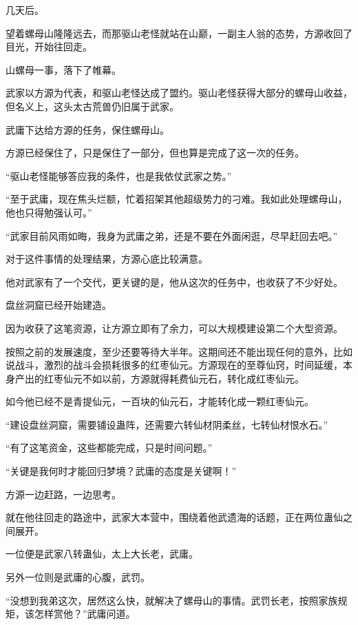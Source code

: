 
\begin{this_body}



几天后。

望着螺母山隆隆远去，而那驱山老怪就站在山巅，一副主人翁的态势，方源收回了目光，开始往回走。

山螺母一事，落下了帷幕。

武家以方源为代表，和驱山老怪达成了盟约。驱山老怪获得大部分的螺母山收益，但名义上，这头太古荒兽仍旧属于武家。

武庸下达给方源的任务，保住螺母山。

方源已经保住了，只是保住了一部分，但也算是完成了这一次的任务。

“驱山老怪能够答应我的条件，也是我依仗武家之势。”

“至于武庸，现在焦头烂额，忙着招架其他超级势力的刁难。我如此处理螺母山，他也只得勉强认可。”

“武家目前风雨如晦，我身为武庸之弟，还是不要在外面闲逛，尽早赶回去吧。”

对于这件事情的处理结果，方源心底比较满意。

他对武家有了一个交代，更关键的是，他从这次的任务中，也收获了不少好处。

盘丝洞窟已经开始建造。

因为收获了这笔资源，让方源立即有了余力，可以大规模建设第二个大型资源。

按照之前的发展速度，至少还要等待大半年。这期间还不能出现任何的意外，比如说战斗，激烈的战斗会损耗很多的红枣仙元。方源现在的至尊仙窍，时间延缓，本身产出的红枣仙元不如以前，方源就得耗费仙元石，转化成红枣仙元。

如今他已经不是青提仙元，一百块的仙元石，才能转化成一颗红枣仙元。

“建设盘丝洞窟，需要铺设蛊阵，还需要六转仙材阴柔丝，七转仙材恨水石。”

“有了这笔资金，这些都能完成，只是时间问题。”

“关键是我何时才能回归梦境？武庸的态度是关键啊！”

方源一边赶路，一边思考。

就在他往回走的路途中，武家大本营中，围绕着他武遗海的话题，正在两位蛊仙之间展开。

一位便是武家八转蛊仙，太上大长老，武庸。

另外一位则是武庸的心腹，武罚。

“没想到我弟这次，居然这么快，就解决了螺母山的事情。武罚长老，按照家族规矩，该怎样赏他？”武庸问道。


\end{this_body}
